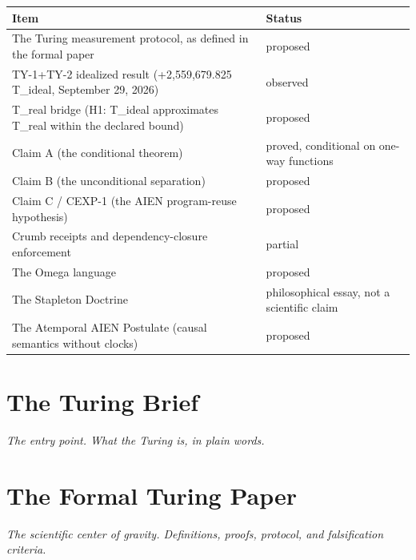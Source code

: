 \documentclass[11pt,letterpaper]{article}
\begin{document}
\begin{center}
\begin{tabular}{p{} p{}}
\hline
\textbf{Item} & \textbf{Status} \\
\hline
The Turing measurement protocol, as defined in the formal paper & proposed \\
TY-1+TY-2 idealized result (+2,559,679.825 T\_ideal, September 29, 2026) & observed \\
T\_real bridge (H1: T\_ideal approximates T\_real within the declared bound) & proposed \\
Claim A (the conditional theorem) & proved, conditional on one-way functions \\
Claim B (the unconditional separation) & proposed \\
Claim C / CEXP-1 (the AIEN program-reuse hypothesis) & proposed \\
Crumb receipts and dependency-closure enforcement & partial \\
The Omega language & proposed \\
The Stapleton Doctrine & philosophical essay, not a scientific claim \\
The Atemporal AIEN Postulate (causal semantics without clocks) & proposed \\
\hline
\end{tabular}
\end{center}

\newpage
\tableofcontents
\newpage

\section*{The Turing Brief}
\begin{center}\textit{The entry point. What the Turing is, in plain words.}\end{center}
\newpage


\section*{The Formal Turing Paper}
\begin{center}\textit{The scientific center of gravity. Definitions, proofs, protocol, and falsification criteria.}\end{center}
\newpage

\end{document}
